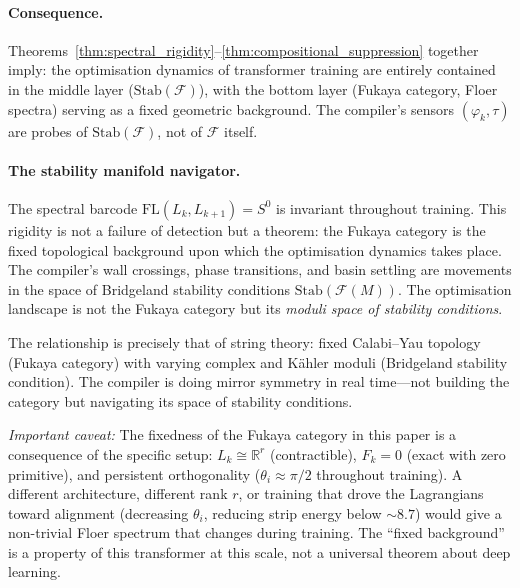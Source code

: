 \documentclass[11pt]{amsart}
\begin{document}
\paragraph{Consequence.}
Theorems~\ref{thm:spectral_rigidity}--\ref{thm:compositional_suppression}
together imply:
the optimisation dynamics of transformer training are entirely contained
in the middle layer ($\mathrm{Stab}(\mathcal{F})$), with the bottom layer
(Fukaya category, Floer spectra) serving as a fixed geometric background.
The compiler's sensors $(\varphi_k, \tau)$ are probes of
$\mathrm{Stab}(\mathcal{F})$, not of $\mathcal{F}$ itself.

\paragraph{The stability manifold navigator.}
The spectral barcode $\mathrm{FL}(L_k, L_{k+1}) = S^0$ is invariant
throughout training.
This rigidity is not a failure of detection but a theorem:
the Fukaya category is the fixed topological background upon which
the optimisation dynamics takes place.
The compiler's wall crossings, phase transitions, and basin settling
are movements in the space of Bridgeland stability conditions
$\mathrm{Stab}(\mathcal{F}(M))$.
The optimisation landscape is not the Fukaya category but its
\emph{moduli space of stability conditions}.

The relationship is precisely that of string theory:
fixed Calabi--Yau topology (Fukaya category) with varying complex and
K\"{a}hler moduli (Bridgeland stability condition).
The compiler is doing mirror symmetry in real time---not building the
category but navigating its space of stability conditions.

\emph{Important caveat:}
The fixedness of the Fukaya category in this paper is a consequence of
the specific setup: $L_k \cong \mathbb{R}^r$ (contractible), $F_k = 0$
(exact with zero primitive), and persistent orthogonality
($\theta_i \approx \pi/2$ throughout training).
A different architecture, different rank $r$, or training that drove
the Lagrangians toward alignment (decreasing $\theta_i$, reducing strip
energy below $\sim 8.7$) would give a non-trivial Floer spectrum that
changes during training.
The ``fixed background'' is a property of this transformer at this scale,
not a universal theorem about deep learning.
\end{document}
